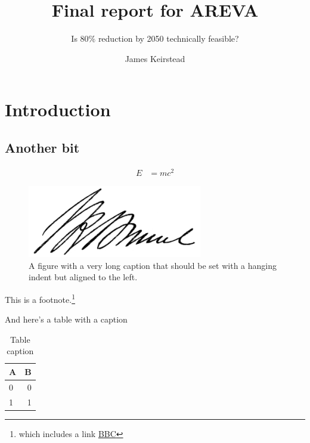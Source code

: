 \documentclass[a4paper, vc]{projectreport}
\title{Final report for AREVA}
\subtitle{Is 80\% reduction by 2050 technically feasible?}
\author{James Keirstead}
\begin{document}
\begin{titlingpage}
  \maketitle
\end{titlingpage}

\chapter{Introduction}

\lipsum[1]

\section{Another bit}
\lipsum[2]

\begin{align*}
E &= mc^2
\end{align*}

\begin{figure}[htbp]
  \includegraphics[width=3in]{Isambard_Kingdom_Brunel_signature.png}
  \caption{A figure with a very long caption that should be set with a hanging indent but aligned to the left.}
\end{figure}

This is a footnote.\footnote{which includes a link \href{http://www.bbc.co.uk}{BBC}}

And here's a table with a caption
\begin{table}[htbp]
  \centering
  \begin{tabular}{lr}
    \toprule
    A & B \\
    \midrule
    0 & 0 \\
    1 & 1 \\
    \bottomrule
  \end{tabular}
  \caption{Table caption}
\end{table}
\end{document}
